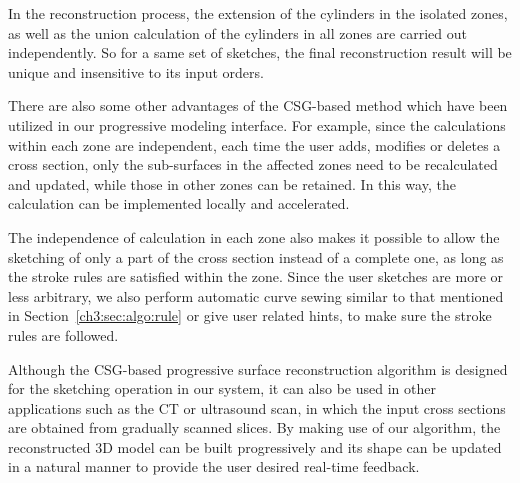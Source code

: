 In the reconstruction process, the extension of  the cylinders in
the isolated zones, as well as the union calculation of the
cylinders in all zones are carried out independently. So for a same
set of sketches, the final reconstruction result will be unique and
insensitive to its input orders.

There are also some other advantages of the  CSG-based method which
have been utilized in our progressive modeling interface. For
example, since the calculations within each zone are independent,
each time the user adds, modifies or deletes a cross section, only
the sub-surfaces in the affected zones need to be recalculated and
updated, while those in other zones can be retained. In this way,
the calculation can be implemented locally and accelerated.

The independence of calculation in each zone also makes  it possible
to allow the sketching of only a part of the cross section instead
of a complete one, as long as the stroke rules are satisfied within
the zone. Since the user sketches are more or less arbitrary, we
also perform automatic curve sewing similar to that mentioned in
Section~\ref{ch3:sec:algo:rule} or give user related hints, to make
sure the stroke rules are followed.

Although the CSG-based progressive surface reconstruction  algorithm
is designed for the sketching operation in our system, it can also
be used in other applications such as the CT or ultrasound scan, in
which the input cross sections are obtained from gradually scanned
slices. By making use of our algorithm, the reconstructed 3D model
can be built progressively and its shape can be updated in a natural
manner to provide the user desired real-time feedback.
